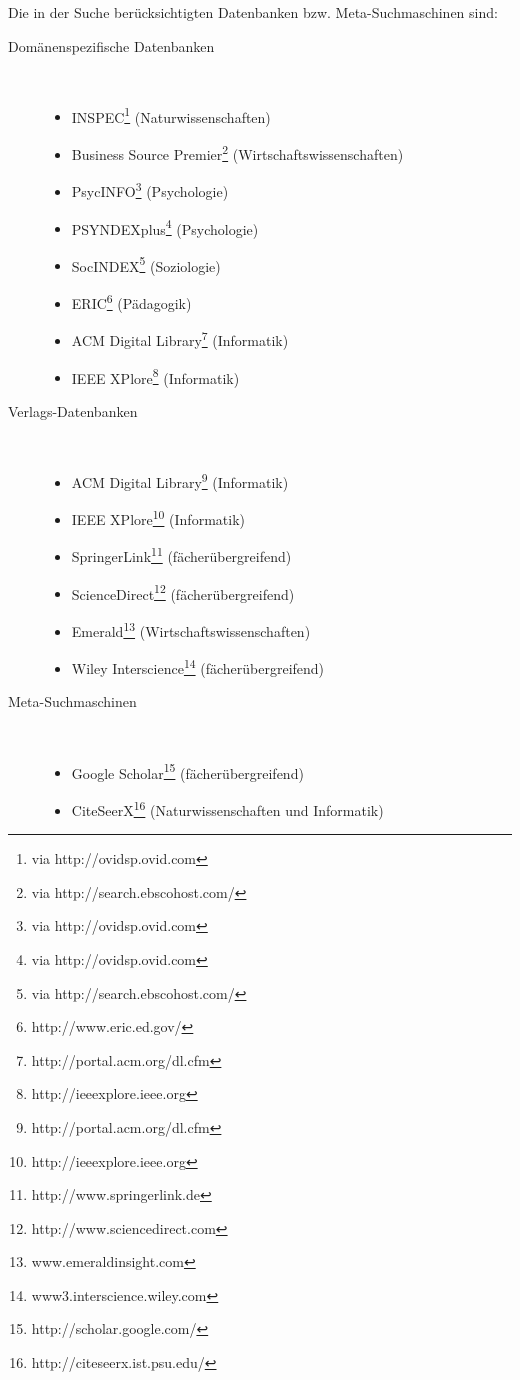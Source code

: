 Die in der Suche berücksichtigten Datenbanken bzw. Meta-Suchmaschinen sind:
\begin{description}
	\item[Domänenspezifische Datenbanken]\ 
		\begin{itemize}
			\item INSPEC\footnote{via http://ovidsp.ovid.com} (Naturwissenschaften)
			\item Business Source Premier\footnote{via http://search.ebscohost.com/} (Wirtschaftswissenschaften)
			\item PsycINFO\footnote{via http://ovidsp.ovid.com} (Psychologie)
			\item PSYNDEXplus\footnote{via http://ovidsp.ovid.com} (Psychologie)
			\item SocINDEX\footnote{via http://search.ebscohost.com/} (Soziologie)
			\item ERIC\footnote{http://www.eric.ed.gov/} (Pädagogik)
			\item ACM Digital Library\footnote{http://portal.acm.org/dl.cfm} (Informatik)
			\item IEEE XPlore\footnote{http://ieeexplore.ieee.org} (Informatik)
		\end{itemize}
	\item[Verlags-Datenbanken]\ 
		\begin{itemize}
			\item ACM Digital Library\footnote{http://portal.acm.org/dl.cfm} (Informatik)
			\item IEEE XPlore\footnote{http://ieeexplore.ieee.org} (Informatik)
			\item SpringerLink\footnote{http://www.springerlink.de} (fächerübergreifend)
			\item ScienceDirect\footnote{http://www.sciencedirect.com} (fächerübergreifend)
			\item Emerald\footnote{www.emeraldinsight.com} (Wirtschaftswissenschaften)
			\item Wiley Interscience\footnote{www3.interscience.wiley.com} (fächerübergreifend)
		\end{itemize}
	\item[Meta-Suchmaschinen]\ 
	 	\begin{itemize}
	 		\item Google Scholar\footnote{http://scholar.google.com/} (fächerübergreifend)
	 		\item CiteSeerX\footnote{http://citeseerx.ist.psu.edu/} (Naturwissenschaften und Informatik)
	 	\end{itemize}
\end{description}

